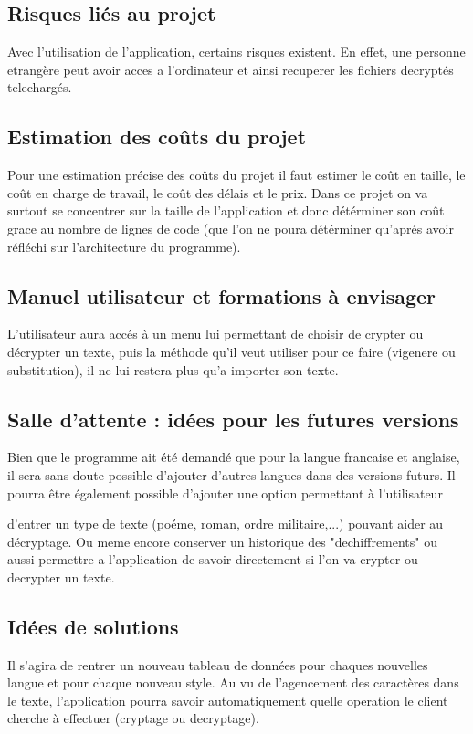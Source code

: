 \documentclass[a4]{article}
\begin{document}
		\subsection{Risques liés au projet}
		Avec l'utilisation de l'application, certains risques existent. En effet, une personne etrangère peut avoir 			acces a l'ordinateur et ainsi recuperer les fichiers decryptés telechargés.
		\subsection{Estimation des coûts du projet}
		 	Pour une estimation précise des coûts du projet il faut estimer le coût en taille, 
			le coût en charge de travail, le coût des délais et le prix. Dans ce projet on va surtout 
			se concentrer sur la taille de l'application et donc détérminer son coût grace au nombre de 
			lignes de code (que l'on ne poura détérminer qu'aprés avoir réfléchi sur l'architecture du 				programme).		  		
		\subsection{Manuel utilisateur et formations à envisager}
			L'utilisateur aura accés à un menu lui permettant de choisir de crypter ou décrypter un texte,
			puis la méthode qu'il veut utiliser pour ce faire (vigenere ou substitution), il ne lui restera 
			plus qu'a importer son texte.
		\subsection{Salle d’attente : idées pour les futures versions}
			Bien que le programme ait été demandé que pour la langue francaise et anglaise, 
			il sera sans doute possible d'ajouter d'autres langues dans des versions futurs. 
			Il pourra être également possible d'ajouter une option permettant à l'utilisateur

			d'entrer un type de texte (poéme, roman, ordre militaire,...) pouvant aider au décryptage. Ou meme 				encore conserver un historique des "dechiffrements" ou aussi permettre a l'application de savoir 			directement si l'on va crypter ou decrypter un texte.

		\subsection{Idées de solutions}
		 	Il s'agira de rentrer un nouveau tableau de données pour chaques nouvelles langue et pour 
			chaque nouveau style.
			Au vu de l'agencement des caractères dans le texte, l'application pourra savoir automatiquement quelle 				operation le client cherche à effectuer (cryptage ou decryptage).
\end{document}
